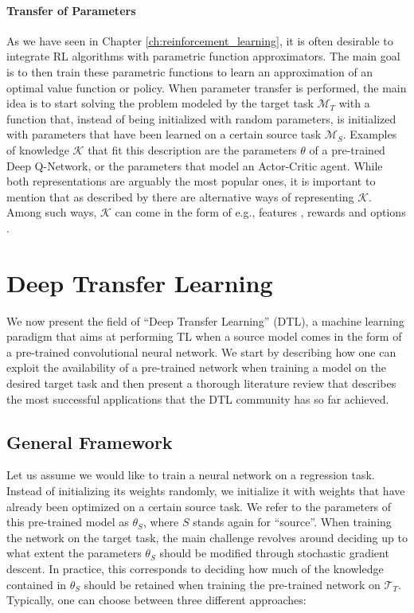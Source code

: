 \paragraph{\textbf{\uppercase{T}ransfer of \uppercase{P}arameters}} As we have seen in Chapter \ref{ch:reinforcement_learning}, it is often desirable to integrate RL algorithms with parametric function approximators. The main goal is to then train these parametric functions to learn an approximation of an optimal value function or policy. When parameter transfer is performed, the main idea is to start solving the problem modeled by the target task $\mathcal{M}_T$ with a function that, instead of being initialized with random parameters, is initialized with parameters that have been learned on a certain source task $\mathcal{M}_S$. Examples of knowledge $\mathcal{K}$ that fit this description are the parameters $\theta$ of a pre-trained Deep Q-Network, or the parameters that model an Actor-Critic agent.  
\bigbreak
While both representations are arguably the most popular ones, it is important to mention that as described by \citet{tirinzoni2018transfer} there are alternative ways of representing $\mathcal{K}$. Among such ways, $\mathcal{K}$ can come in the form of e.g., features \cite{mehta2008transfer,barreto2017successor}, rewards \cite{konidaris2006autonomous,schaal2004estimating} and options \cite{singh2005intrinsically}.

\section{Deep Transfer Learning}
\label{sec:literature_review}

We now present the field of ``Deep Transfer Learning'' (DTL), a machine learning paradigm that aims at performing TL when a source model comes in the form of a pre-trained convolutional neural network. We start by describing how one can exploit the availability of a pre-trained network when training a model on the desired target task and then present a thorough literature review that describes the most successful applications that the DTL community has so far achieved.

\subsection{General Framework}
\label{sec:tl_general_framework}

Let us assume we would like to train a neural network on a regression task. Instead of initializing its weights randomly, we initialize it with weights that have already been optimized on a certain source task. We refer to the parameters of this pre-trained model as $\theta_S$, where $S$ stands again for ``source''. When training the network on the target task, the main challenge revolves around deciding up to what extent the parameters $\theta_S$ should be modified through stochastic gradient descent. In practice, this corresponds to deciding how much of the knowledge contained in $\theta_S$ should be retained when training the pre-trained network on $\mathcal{T}_T$. Typically, one can choose between three different approaches:

